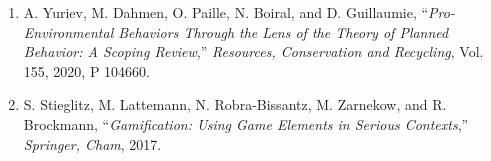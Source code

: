 \documentclass[a4paper,12pt,oneside]{report}
\let\originalitem\item
\renewcommand{\item}{\Needspace{10\baselineskip}\originalitem}
\begin{document}
\begin{enumerate}
    \item[{[43]}] \label{bib:yuriev2020} A. Yuriev, M. Dahmen, O. Paille, N. Boiral, and D. Guillaumie, ``\textit{Pro-Environmental Behaviors Through the Lens of the Theory of Planned Behavior: A Scoping Review},'' \textit{Resources, Conservation and Recycling}, Vol. 155, 2020, P 104660.

    \item[{[44]}] \label{bib:stieglitz2017} S. Stieglitz, M. Lattemann, N. Robra-Bissantz, M. Zarnekow, and R. Brockmann, ``\textit{Gamification: Using Game Elements in Serious Contexts},'' \textit{Springer, Cham}, 2017.
\end{enumerate}
\end{document}
